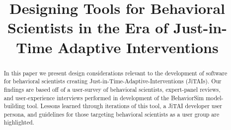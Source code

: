 \documentclass{sigchi}
\begin{document}
\title{Designing Tools for Behavioral Scientists in the Era of Just-in-Time Adaptive Interventions}

\author{%
  \alignauthor{Tylar Murray \\
    \affaddr{University of South Florida}\\%
    \affaddr{Tampa, USA}\\
    \email{tylarmurray@mail.usf.edu}\\
    }
  \alignauthor{Eric Hekler\\
    \affaddr{Arizona State University}\\%
    \affaddr{Phoenix, USA}\\
    }
  \alignauthor{Donna Spruijt-Metz \\
    \affaddr{University of Southern California}\\%
    \affaddr{ Los Angeles, USA}\\
    }
  \alignauthor{Daniel E. Rivera \\
    \affaddr{Arizona State University}\\%
    \affaddr{Tempe, USA}\\
    }
  \alignauthor{Andrew Raij \\
    \affaddr{University of Central Florida}\\%
    \affaddr{Orlando, USA}\\
    }
}

\maketitle

\begin{abstract}
In this paper we present design considerations relevant to the development of software for behavioral scientists creating Just-in-Time-Adaptive-Interventions (JiTAIs). 
Our findings are based off of a user-survey of behavioral scientists, expert-panel reviews, and user-experience interviews performed in development of the BehaviorSim model-building tool. 
Lessons learned through iterations of this tool, a JiTAI developer user persona, and guidelines for those targeting behavioral scientists as a user group are highlighted. 
\end{abstract}
\end{document}
